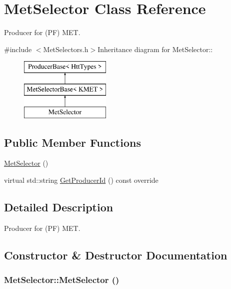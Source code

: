 \hypertarget{classMetSelector}{
\section{MetSelector Class Reference}
\label{classMetSelector}
}


Producer for (PF) MET.  


{\ttfamily \#include $<$MetSelectors.h$>$}Inheritance diagram for MetSelector::\begin{figure}[H]
\begin{center}
\leavevmode
\includegraphics[height=3cm]{classMetSelector}
\end{center}
\end{figure}
\subsection*{Public Member Functions}
\begin{DoxyCompactItemize}
\item 
\hyperlink{classMetSelector_a038a4dc9cdc1463281f29a159495f1cf}{MetSelector} ()
\item 
virtual std::string \hyperlink{classMetSelector_ad28e5f2667e2de54aa810bc21676bb8e}{GetProducerId} () const override
\end{DoxyCompactItemize}


\subsection{Detailed Description}
Producer for (PF) MET. 

\subsection{Constructor \& Destructor Documentation}
\hypertarget{classMetSelector_a038a4dc9cdc1463281f29a159495f1cf}{
\subsubsection[{MetSelector}]{\setlength{\rightskip}{0pt plus 5cm}MetSelector::MetSelector ()}}
\label{classMetSelector_a038a4dc9cdc1463281f29a159495f1cf}


